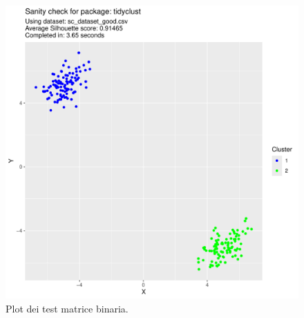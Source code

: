 \documentclass[italian]{article}
\begin{document}
\begin{figure}[h]
\begin{boxedminipage}{0.5\textwidth}
				\end{boxedminipage}
				\begin{boxedminipage}{0.5\textwidth}
					\includegraphics[width = \textwidth, page = 3]{results/results_TIDYCLUST.pdf}
				\end{boxedminipage}
				\begin{boxedminipage}{0.5\textwidth}
				\end{boxedminipage}
				\caption{Plot dei test matrice binaria.}
				\label{fig:bm}
			\end{figure}
\end{document}
